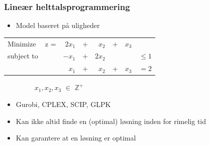 \documentclass[smaller,handouts]{beamer}
\begin{document}

\begin{frame}
\frametitle{Lineær helttalsprogrammering}
\begin{itemize}[<+->]  
\item Model baseret på uligheder
\end{itemize}
\begin{table}[]
\begin{center}
\label{my-label}
\begin{tabular}{llrcrlrl}
Minimize   & z =&$2x_1$        & +  & $x_2$       & + & $x_3$ &          \\
subject to &     &$-x_1$        & + & $2x_2$      &   &       & $\leq 1$  \\
           &     &$x_1$         & + & $x_2$       & + & $x_3$ & $=2$     
               
\end{tabular}
\end{center}
$\qquad \qquad $ $x_1,x_2,x_3 $  $\in$ $\mathbb{Z}^+$ 
\end{table}

\begin{itemize}[<+->]
\item Gurobi, CPLEX, SCIP, GLPK
\item \alert{Kan ikke altid finde en (optimal) løsning inden for rimelig tid}
\item Kan garantere at en løsning er optimal 
\end{itemize}

    
\end{frame}


\end{document}
